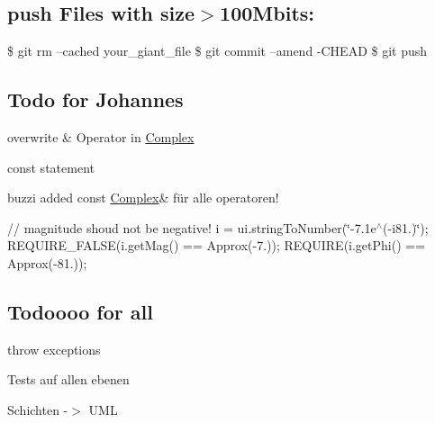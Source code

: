 \subsection*{push Files with size$>$100\+Mbits\+:}

\$ git rm --cached your\+\_\+giant\+\_\+file \$ git commit --amend -\/\+C\+H\+E\+AD \$ git push

\subsection*{Todo for Johannes}


\begin{DoxyItemize}
\item overwrite \& Operator in \mbox{\hyperlink{class_complex}{Complex}}
\item const statement
\item buzzi added const \mbox{\hyperlink{class_complex}{Complex}}\& für alle operatoren!
\item // magnitude shoud not be negative! i = ui.\+string\+To\+Number(\char`\"{}-\/7.\+1e$^\wedge$(-\/i81.)\char`\"{}); R\+E\+Q\+U\+I\+R\+E\+\_\+\+F\+A\+L\+SE(i.\+get\+Mag() == Approx(-\/7.)); R\+E\+Q\+U\+I\+RE(i.\+get\+Phi() == Approx(-\/81.));
\end{DoxyItemize}

\subsection*{Todoooo for all}


\begin{DoxyItemize}
\item throw exceptions
\item Tests auf allen ebenen
\item Schichten -\/$>$ U\+ML 
\end{DoxyItemize}